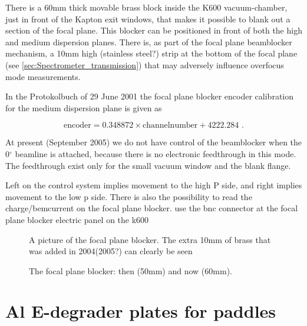 \documentclass[11pt]{report}
\begin{document}
There is a 60mm thick movable brass block inside the K600 vacuum-chamber, just
in front of the Kapton exit windows, that makes it possible to blank out a section 
of the focal plane. This blocker can be positioned in front of 
both the high and medium dispersion planes.
There is, as part of the focal plane beamblocker mechanism, a 10mm high (stainless steel?) 
strip at the bottom of the focal plane (see \ref{sec:Spectrometer_transmission}) that may adversely influence
overfocus mode measurements.

In the Protokolbuch of 29 June 2001 the focal plane blocker encoder 
calibration for the medium dispersion plane is given as

\begin{equation} 
\textrm{encoder}=0.348872 \times \textrm{channelnumber} + 4222.284
\textrm{     .}
\end{equation} 

At present (September 2005) we do not have control of the beamblocker when the
0$^{\circ}$ beamline is attached, because there is no electronic feedthrough 
in this mode. The feedthrough exist only for the small vacuum window and the blank flange.

Left on the control system implies movement to the high P side, and right implies movement 
to the low p side.
There is also the possibility to read the charge/bemcurrent on the focal plane blocker.
use the bnc connector at the focal plane blocker electric panel on the k600

\begin{figure}[!ht]
\centerline{\vspace{0cm}\hspace{0cm}
}
\centering
\caption{A picture of the focal plane blocker. The extra 10mm of brass that was added in
2004(2005?)  can clearly be seen}
\label{fig:fpbs-pic}
\end{figure} 


\begin{figure}[!ht]
\centerline{\vspace{0cm}\hspace{0cm}
}
\centering
\caption{The focal plane blocker: then (50mm) and now (60mm).}
\label{fig:fpbs-then-now}
\end{figure} 




\section{Al E-degrader plates for paddles}
\end{document}
